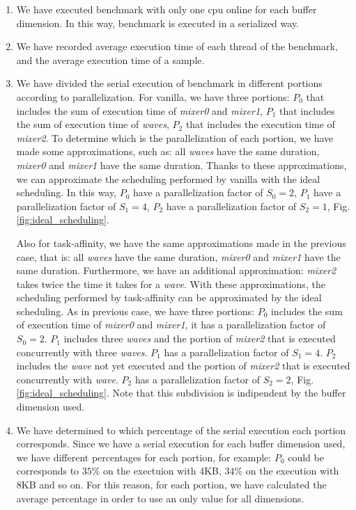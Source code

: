 \begin{enumerate}
\item We have executed benchmark with only one cpu online for each buffer dimension. In this way, benchmark is executed in a serialized way.
\item We have recorded average execution time of each thread of the benchmark, and the average execution time of a sample.
\item We have divided the serial execution of benchmark in different portions according to parallelization. For vanilla, we have three portions: $P_{0}$ 
that includes the sum of execution time of \textit{mixer0} and \textit{mixer1}, $P_{1}$ that includes the sum of execution time of \textit{waves}, $P_{2}$ 
that includes the execution time of \textit{mixer2}. To determine which is the parallelization of each portion, we have made some approximations, such as: 
all \textit{waves} have the same duration, \textit{mixer0} and \textit{mixer1} have the same duration. Thanks to these approximations, we can approximate 
the scheduling performed by vanilla with the ideal scheduling. In this way, $P_{0}$ have a parallelization factor of $S_{0} = 2$, $P_{1}$ have a 
parallelization factor of $S_{1} = 4$, $P_{2}$ have a parallelization factor of $S_{2} = 1$, Fig. \ref{fig:ideal_scheduling}.

Also for task-affinity, we have the same approximations made in the previous case, that is: all \textit{waves} have the same duration, \textit{mixer0} and 
\textit{mixer1} have the same duration. Furthermore, we have an additional approximation: \textit{mixer2} takes twice the time it takes for a \textit{wave}. 
With these approximations, the scheduling performed by task-affinity can be approximated by the ideal scheduling. As in previous case, we have three 
portions: $P_{0}$ includes the sum of execution time of \textit{mixer0} and \textit{mixer1}, it has a parallelization factor of $S_{0} = 2$. $P_{1}$ 
includes three \textit{waves} and the portion of \textit{mixer2} that is executed concurrently with three \textit{waves}. $P_{1}$ has a parallelization 
factor of $S_{1} = 4$. $P_{2}$ includes the \textit{wave} not yet executed and the portion of \textit{mixer2} that is executed concurrently with 
\textit{wave}. $P_{2}$ has a parallelization factor of $S_{2} = 2$, Fig. \ref{fig:ideal_scheduling}. Note that this subdivision is indipendent by the 
buffer dimension used.

\item We have determined to which percentage of the serial execution each portion corresponds. Since we have a serial execution for each buffer dimension 
used, we have different percentages for each portion, for example: $P_{0}$ could be corresponds to $35\%$ on the exectuion with 4KB, $34\%$ on the execution 
with 8KB and so on. For this reason, for each portion, we have calculated the average percentage in order to use an only value for all dimensions.

\end{enumerate}
